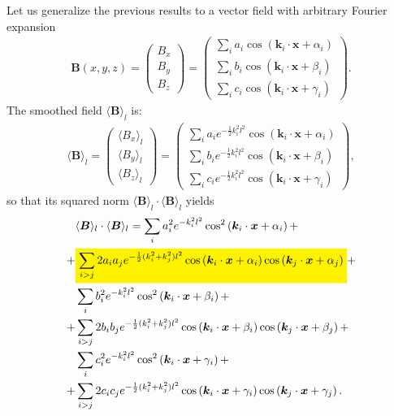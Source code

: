 \documentclass[]{article}
\newcommand{\mathcolorbox}[2]{\colorbox{#1}{$\displaystyle #2$}}
\begin{document}
Let us generalize the previous results to a vector field with arbitrary Fourier expansion
%
\begin{align}
	\bm B (x,y,z) = \begin{pmatrix}
		B_x \\ B_y \\ B_z
	\end{pmatrix} = \begin{pmatrix}
		\sum_i a_i \cos \left( \bm k_i \cdot \bm x  + \alpha_i \right)  \\ \sum_i b_i \cos \left( \bm k_i \cdot \bm x  + \beta_i \right) \\ \sum_i c_i \cos \left( \bm k_i \cdot \bm x  + \gamma_i \right)
	\end{pmatrix}.
\end{align}
%
The smoothed field $\langle \bm B \rangle_l$ is:
%
\begin{align}
	\langle \bm B \rangle_l = \begin{pmatrix}
		\langle B_x \rangle_l \\ \langle B_y \rangle_l \\ \langle B_z \rangle_l
	\end{pmatrix} = \begin{pmatrix}
		\sum_i a_i e^{-\frac{1}{2} k_i^2 l^2} \cos \left( \bm k_i \cdot \bm x  + \alpha_i \right)  \\ \sum_i b_i e^{-\frac{1}{2} k_i^2 l^2} \cos \left( \bm k_i \cdot \bm x  + \beta_i \right) \\ \sum_i c_i e^{-\frac{1}{2} k_i^2 l^2} \cos \left( \bm k_i \cdot \bm x  + \gamma_i \right)
	\end{pmatrix},
\end{align}
%
so that its squared norm $\langle \bm B \rangle_l \cdot \langle \bm B \rangle_l$ yields
%
\begin{align}
	&\langle \bm B \rangle_l \cdot \langle \bm B \rangle_l = \sum_i a_i^2 e^{- k_i^2 l^2} \cos^2 \left( \bm k_i \cdot \bm x  + \alpha_i \right) + \nonumber \\
	+& \mathcolorbox{yellow}{\sum_{i>j} 2 a_i a_j e^{-\frac{1}{2} (k_i^2 + k_j^2) l^2} \cos \left( \bm k_i \cdot \bm x  + \alpha_i \right) \cos \left( \bm k_j \cdot \bm x  + \alpha_j \right)} + \nonumber \\
	&\sum_i b_i^2 e^{- k_i^2 l^2} \cos^2 \left( \bm k_i \cdot \bm x  + \beta_i \right) + \nonumber \\
	+&\sum_{i>j} 2 b_i b_j e^{-\frac{1}{2} (k_i^2 + k_j^2) l^2} \cos \left( \bm k_i \cdot \bm x  + \beta_i \right) \cos \left( \bm k_j \cdot \bm x  + \beta_j \right) + \nonumber \\
	&\sum_i c_i^2 e^{- k_i^2 l^2} \cos^2 \left( \bm k_i \cdot \bm x  + \gamma_i \right) + \nonumber \\
	+&\sum_{i>j} 2 c_i c_j e^{-\frac{1}{2} (k_i^2 + k_j^2) l^2} \cos \left( \bm k_i \cdot \bm x  + \gamma_i \right) \cos \left( \bm k_j \cdot \bm x  + \gamma_j \right).
\end{align}
\end{document}
